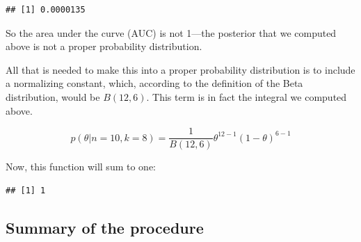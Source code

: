 \documentclass[12pt,]{krantz}
\newenvironment{Shaded}{\begin{snugshade}}{\end{snugshade}}
\newcommand{\KeywordTok}[1]{\textcolor[rgb]{0.13,0.29,0.53}{\textbf{#1}}}
\newcommand{\DataTypeTok}[1]{\textcolor[rgb]{0.13,0.29,0.53}{#1}}
\newcommand{\DecValTok}[1]{\textcolor[rgb]{0.00,0.00,0.81}{#1}}
\newcommand{\StringTok}[1]{\textcolor[rgb]{0.31,0.60,0.02}{#1}}
\newcommand{\ControlFlowTok}[1]{\textcolor[rgb]{0.13,0.29,0.53}{\textbf{#1}}}
\newcommand{\OperatorTok}[1]{\textcolor[rgb]{0.81,0.36,0.00}{\textbf{#1}}}
\newcommand{\NormalTok}[1]{#1}
\theoremstyle{definition}
\theoremstyle{definition}
\theoremstyle{definition}
\theoremstyle{remark}
\begin{document}
\begin{Shaded}
\end{Shaded}

\begin{verbatim}
## [1] 0.0000135
\end{verbatim}

So the area under the curve (AUC) is not 1---the posterior that we
computed above is not a proper probability distribution.

All that is needed to make this into a proper probability distribution
is to include a normalizing constant, which, according to the definition
of the Beta distribution, would be \(B(12,6)\). This term is in fact the
integral we computed above.

\begin{equation}
p(\theta|n=10,k=8) = \frac{1}{B(12,6)} \theta^{12-1} (1-\theta)^{6-1} 
\end{equation}

Now, this function will sum to one:

\begin{Shaded}
\end{Shaded}

\begin{verbatim}
## [1] 1
\end{verbatim}

\subsection{Summary of the procedure}\label{summary-of-the-procedure}
\end{document}
